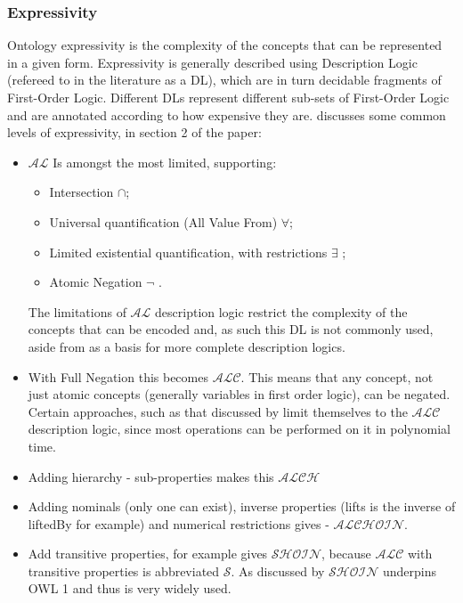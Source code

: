 \subsubsection{Expressivity}
Ontology expressivity is the complexity of the concepts that can be represented in a given form. Expressivity is generally described using Description Logic (refereed to in the literature as a DL), which are in turn decidable fragments of First-Order Logic. Different DLs represent different sub-sets of First-Order Logic and are annotated according to how expensive they are. 
\citet{Horridge2012} discusses some common levels of expressivity, in section 2 of the paper:
\begin{itemize}
    \item  \(\mathcal{AL}\) Is amongst the most limited, supporting:
        \begin{itemize}
            \item   Intersection  \(\cap\);
            \item   Universal quantification (All Value From) \( \forall \);
            \item   Limited existential quantification, with restrictions \( \exists\) ;
            \item   Atomic Negation \(\neg \) .
        \end{itemize}        
        The limitations of \(\mathcal{AL}\) description logic restrict the complexity of the concepts that can be encoded and, as such this DL is not commonly used, aside from as a basis for more complete description logics.
        \item With Full Negation this becomes  \(\mathcal{ALC}\). This means that any concept, not just atomic concepts (generally variables in first order logic), can be negated. Certain approaches, such as that discussed by \citet{Meyer2006} limit themselves to the \(\mathcal{ALC}\) description logic, since most operations can be performed on it in polynomial time.
        \item Adding hierarchy - sub-properties makes this \(\mathcal{ALCH}\)
        \item Adding nominals (only one can exist), inverse properties (lifts is the inverse of liftedBy for example) and numerical restrictions gives - \(\mathcal{ALCHOIN}\). 
        \item Add transitive properties, for example  gives \(\mathcal{SHOIN}\), because \(\mathcal{ALC}\) with transitive properties is abbreviated \(\mathcal{S}\). As discussed by \citet{Horrocks2006a} \(\mathcal{SHOIN}\) underpins OWL 1 and thus is very widely used.  
\end{itemize}
